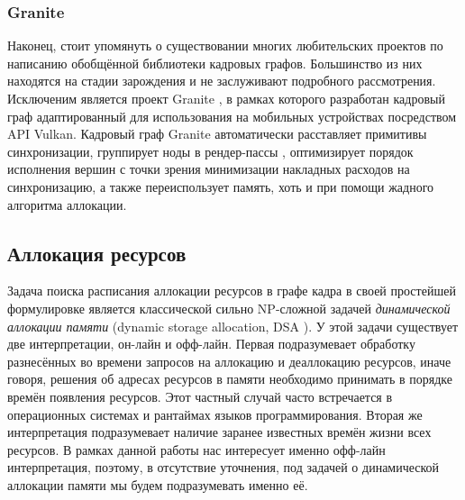 \subsubsection*{Granite}
Наконец, стоит упомянуть о существовании многих любительских проектов по написанию обобщённой библиотеки кадровых графов. Большинство из них находятся на стадии зарождения и не заслуживают подробного рассмотрения.
Исключеним является проект Granite \cite{GraniteBlogPost}, в рамках которого разработан кадровый граф адаптированный для использования на мобильных устройствах посредством API Vulkan.
Кадровый граф Granite автоматически расставляет примитивы синхронизации, группирует ноды в рендер-пассы \cite[раздел~8]{VulkanSpec}, оптимизирует порядок исполнения вершин с точки зрения минимизации накладных расходов на синхронизацию, а также переиспользует память, хоть и при помощи жадного алгоритма аллокации.

\subsection{Аллокация ресурсов}
Задача поиска расписания аллокации ресурсов в графе кадра в своей простейшей формулировке является классической сильно NP-сложной \cite{DSAnpcomplete} задачей \textit{динамической аллокации памяти} (dynamic storage allocation, DSA \cite[с. 226]{10.5555/574848}).
У этой задачи существует две интерпретации, он-лайн и офф-лайн.
Первая подразумевает обработку разнесённых во времени запросов на аллокацию и деаллокацию ресурсов, иначе говоря, решения об адресах ресурсов в памяти необходимо принимать в порядке времён появления ресурсов.
Этот частный случай часто встречается в операционных системах и рантаймах языков программирования.
Вторая же интерпретация подразумевает наличие заранее известных времён жизни всех ресурсов.
В рамках данной работы нас интересует именно офф-лайн интерпретация, поэтому, в отсутствие уточнения, под задачей о динамической аллокации памяти мы будем подразумевать именно её.

